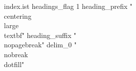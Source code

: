 \usepackage{changepage}
\newenvironment{remark}{\underline{\textbf{注.}}}{\par}

\newenvironment{thmproof}
    {\renewcommand\qedsymbol{$\square$}\color{blue}\begin{adjustwidth}{0em}{2em}\begin{proof}[\textit 证明.~]}
    {\end{proof}\end{adjustwidth}}

\newenvironment{exasolution}
{\renewcommand\qedsymbol{$\square$}\color{blue}\begin{adjustwidth}{0em}{2em}\begin{proof}[\textit 解.~]}
{\end{proof}\end{adjustwidth}}


\begin{filecontents}{index.ist}
headings_flag 1
heading_prefix "{\\centering\\large \\textbf{"
heading_suffix "}}\\nopagebreak\n"
delim_0 "\\nobreak\\dotfill"
\end{filecontents}
\newcommand{\myindex}[1]{\index{#1} \emph{#1}}
\makeindex[columns=3, intoc, title=Alphabetical Index, options= -s index.ist]


\usepackage{fancyhdr}
\pagestyle{fancy} %
\renewcommand{\headrulewidth}{0.0pt} %
\fancyhf{} %
\fancyhead[lo,le]{\leftmark}
\fancyhead[re,ro]{\rightmark}

